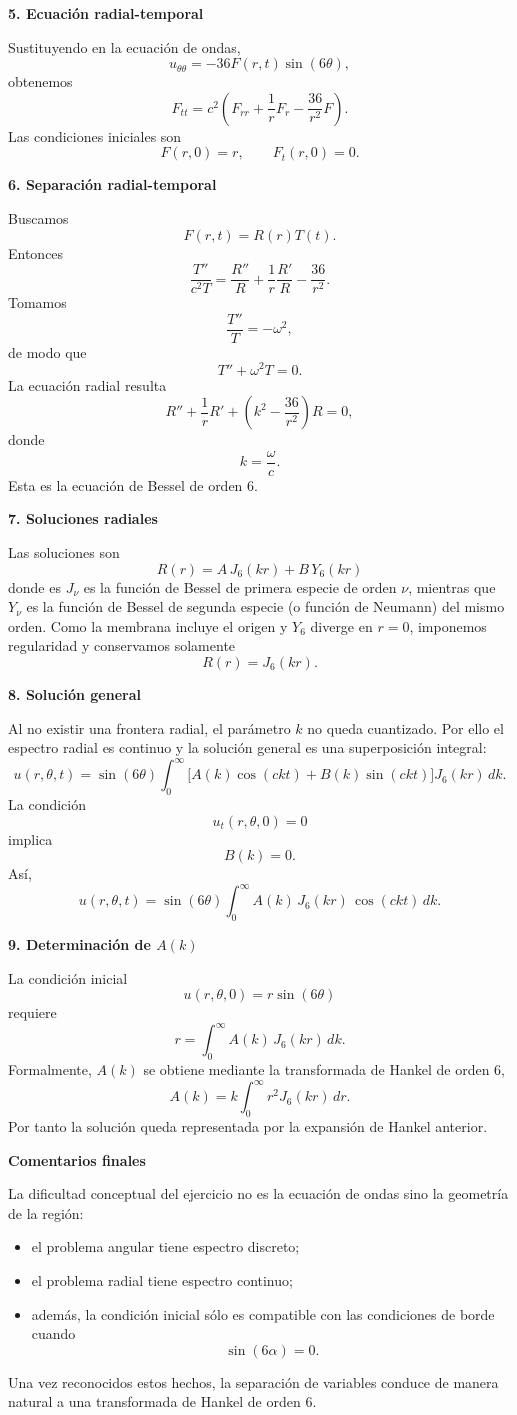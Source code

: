 \documentclass[11pt,spanish]{article}
\newcounter{problema}
\begin{document}
{\bf 5. Ecuación radial-temporal}

Sustituyendo en la ecuación de ondas,
$$
u_{\theta\theta}
=
-36F(r,t)\sin(6\theta),
$$
obtenemos
$$
F_{tt}
=
c^2
\left(
F_{rr}
+\frac1rF_r
-\frac{36}{r^2}F
\right).
$$
Las condiciones iniciales son
$$
F(r,0)=r,
\qquad
F_t(r,0)=0.
$$

{\bf 6. Separación radial-temporal}

Buscamos
$$
F(r,t)=R(r)T(t).
$$
Entonces
$$
\frac{T''}{c^2T}
=
\frac{R''}{R}
+\frac1r\frac{R'}R
-\frac{36}{r^2}.
$$
Tomamos
$$
\frac{T''}{T}
=
-\omega^2,
$$
de modo que
$$
T''+\omega^2T=0.
$$
La ecuación radial resulta
$$
R''+\frac1rR'
+
\left(
k^2-\frac{36}{r^2}
\right)R=0,
$$
donde
$$
k=\frac{\omega}{c}.
$$
Esta es la ecuación de Bessel de orden $6$.

{\bf 7. Soluciones radiales}

Las soluciones son
$$
R(r)
=
A\,J_6(kr)
+
B\,Y_6(kr)
$$
donde es $J_{\nu}$ es la función de Bessel de primera especie de orden $\nu$, mientras que $Y_{\nu}$ es la función de Bessel de segunda especie (o función de Neumann) del mismo orden.
Como la membrana incluye el origen y $Y_6$ diverge en $r=0$, imponemos regularidad y conservamos solamente
$$
R(r)=J_6(kr).
$$

{\bf 8. Solución general}

Al no existir una frontera radial, el parámetro $k$ no queda cuantizado.
Por ello el espectro radial es continuo y la solución general es una superposición integral:
$$
u(r,\theta,t)
=
\sin(6\theta)
\int_0^\infty
\Big[
A(k)\cos(ckt)
+
B(k)\sin(ckt)
\Big]
J_6(kr)\,dk.
$$
La condición
$$
u_t(r,\theta,0)=0
$$
implica
$$
B(k)=0.
$$
Así,
$$
\boxed{
u(r,\theta,t)
=
\sin(6\theta)
\int_0^\infty
A(k)\,
J_6(kr)\,
\cos(ckt)\,dk.
}
$$

{\bf 9. Determinación de $A(k)$}

La condición inicial
$$
u(r,\theta,0)
=
r\sin(6\theta)
$$
requiere
$$
r
=
\int_0^\infty
A(k)\,
J_6(kr)\,dk.
$$
Formalmente, $A(k)$ se obtiene mediante la transformada de Hankel de orden $6$,
$$
A(k)
=
k
\int_0^\infty
r^2J_6(kr)\,dr.
$$
Por tanto la solución queda representada por la expansión de Hankel anterior.

{\bf Comentarios finales}

La dificultad conceptual del ejercicio no es la ecuación de ondas sino la geometría de la región:
\begin{itemize}
\item el problema angular tiene espectro discreto;
\item el problema radial tiene espectro continuo;
\item además, la condición inicial sólo es compatible con las condiciones de borde cuando
$$
\sin(6\alpha)=0.
$$
\end{itemize}
Una vez reconocidos estos hechos, la separación de variables conduce de manera natural a una transformada de Hankel de orden $6$. 
\end{document}
